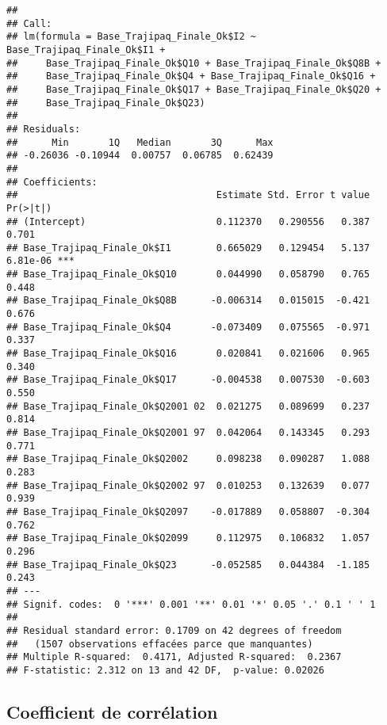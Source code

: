 \documentclass[
]{article}
\newenvironment{Shaded}{\begin{snugshade}}{\end{snugshade}}
\newcommand{\FunctionTok}[1]{\textcolor[rgb]{0.00,0.00,0.00}{#1}}
\newcommand{\NormalTok}[1]{#1}
\newcommand{\SpecialCharTok}[1]{\textcolor[rgb]{0.00,0.00,0.00}{#1}}
\begin{document}
\begin{verbatim}
## 
## Call:
## lm(formula = Base_Trajipaq_Finale_Ok$I2 ~ Base_Trajipaq_Finale_Ok$I1 + 
##     Base_Trajipaq_Finale_Ok$Q10 + Base_Trajipaq_Finale_Ok$Q8B + 
##     Base_Trajipaq_Finale_Ok$Q4 + Base_Trajipaq_Finale_Ok$Q16 + 
##     Base_Trajipaq_Finale_Ok$Q17 + Base_Trajipaq_Finale_Ok$Q20 + 
##     Base_Trajipaq_Finale_Ok$Q23)
## 
## Residuals:
##      Min       1Q   Median       3Q      Max 
## -0.26036 -0.10944  0.00757  0.06785  0.62439 
## 
## Coefficients:
##                                   Estimate Std. Error t value Pr(>|t|)    
## (Intercept)                       0.112370   0.290556   0.387    0.701    
## Base_Trajipaq_Finale_Ok$I1        0.665029   0.129454   5.137 6.81e-06 ***
## Base_Trajipaq_Finale_Ok$Q10       0.044990   0.058790   0.765    0.448    
## Base_Trajipaq_Finale_Ok$Q8B      -0.006314   0.015015  -0.421    0.676    
## Base_Trajipaq_Finale_Ok$Q4       -0.073409   0.075565  -0.971    0.337    
## Base_Trajipaq_Finale_Ok$Q16       0.020841   0.021606   0.965    0.340    
## Base_Trajipaq_Finale_Ok$Q17      -0.004538   0.007530  -0.603    0.550    
## Base_Trajipaq_Finale_Ok$Q2001 02  0.021275   0.089699   0.237    0.814    
## Base_Trajipaq_Finale_Ok$Q2001 97  0.042064   0.143345   0.293    0.771    
## Base_Trajipaq_Finale_Ok$Q2002     0.098238   0.090287   1.088    0.283    
## Base_Trajipaq_Finale_Ok$Q2002 97  0.010253   0.132639   0.077    0.939    
## Base_Trajipaq_Finale_Ok$Q2097    -0.017889   0.058807  -0.304    0.762    
## Base_Trajipaq_Finale_Ok$Q2099     0.112975   0.106832   1.057    0.296    
## Base_Trajipaq_Finale_Ok$Q23      -0.052585   0.044384  -1.185    0.243    
## ---
## Signif. codes:  0 '***' 0.001 '**' 0.01 '*' 0.05 '.' 0.1 ' ' 1
## 
## Residual standard error: 0.1709 on 42 degrees of freedom
##   (1507 observations effacées parce que manquantes)
## Multiple R-squared:  0.4171, Adjusted R-squared:  0.2367 
## F-statistic: 2.312 on 13 and 42 DF,  p-value: 0.02026
\end{verbatim}

\hypertarget{coefficient-de-corruxe9lation}{%
\subsection{Coefficient de
corrélation}\label{coefficient-de-corruxe9lation}}

\begin{Shaded}
\end{Shaded}
\end{document}
